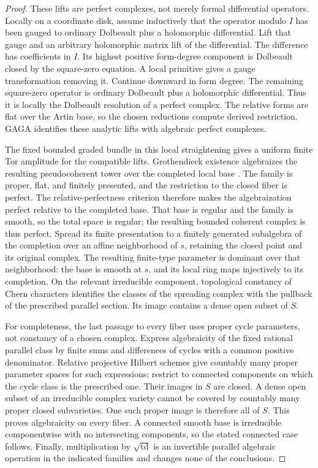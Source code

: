 \documentclass[11pt]{article}
\numberwithin{equation}{section}
\theoremstyle{definition}
\theoremstyle{remark}
\begin{document}
\begin{proof}
These lifts are perfect complexes, not merely formal differential
operators.  Locally on a coordinate disk, assume inductively that the
operator modulo \(I\) has been gauged to ordinary Dolbeault plus a
holomorphic differential.  Lift that gauge and an arbitrary
holomorphic matrix lift of the differential.  The difference has
coefficients in \(I\).  Its highest positive form-degree component is
Dolbeault closed by the square-zero equation.  A local primitive gives
a gauge transformation removing it.  Continue downward in form
degree.  The remaining square-zero operator is ordinary Dolbeault
plus a holomorphic differential.  Thus it is locally the Dolbeault
resolution of a perfect complex.  The relative forms are flat over
the Artin base, so the chosen reductions compute derived restriction.
GAGA identifies these analytic lifts with algebraic perfect complexes.

The fixed bounded graded bundle in this local straightening gives
a uniform finite Tor amplitude for the compatible lifts.
Grothendieck existence algebraizes the resulting pseudocoherent tower
over the completed local base
\cite[Theorem~38.29.6, Tag~0DIG]{PerfectGrothendieckExistence}.
The family is proper, flat, and finitely presented, and the restriction
to the closed fiber is perfect.  The relative-perfectness criterion
\cite[Lemma~37.71.3, Tag~0DJZ]{PerfectGrothendieckExistence} therefore
makes the algebraization perfect relative to the completed base.
That base is regular and the family is smooth, so the total space is
regular; the resulting bounded coherent complex is thus perfect.
Spread its finite presentation to a finitely generated subalgebra of
the completion over an affine neighborhood of \(s\), retaining the
closed point and its original complex.  The resulting finite-type
parameter is dominant over that neighborhood: the base is smooth at
\(s\), and its local ring maps injectively to its completion.
On the relevant irreducible component, topological constancy of Chern
characters identifies the classes of the spreading complex with the
pullback of the prescribed parallel section.  Its image contains a
dense open subset of \(S\).

For completeness, the last passage to every fiber uses proper cycle
parameters, not constancy of a chosen complex.  Express algebraicity
of the fixed rational parallel class by finite sums and differences
of cycles with a common positive denominator.  Relative projective
Hilbert schemes give countably many proper parameter spaces for such
expressions; restrict to connected components on which the cycle
class is the prescribed one.  Their images in \(S\) are closed.
A dense open subset of an irreducible complex variety cannot be
covered by countably many proper closed subvarieties.  One such
proper image is therefore all of \(S\).  This proves algebraicity on
every fiber.  A connected smooth base is irreducible componentwise
with no intersecting components, so the stated connected case follows.
Finally, multiplication by \(\sqrt{\operatorname{td}}\) is an invertible parallel
algebraic operation in the indicated families and changes none of
the conclusions.
\end{proof}
\end{document}
